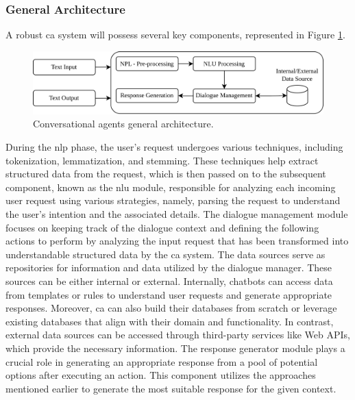 \documentclass[a4paper,fleqn]{cas-dc}
\begin{document}
\subsubsection{General Architecture}

A robust \gls{ca} system will possess several key components, represented in Figure \ref{fig:ConversationalAgentGeneralArchitecture}.

\begin{figure}[htbp]
	\centering
	\includegraphics[width=\linewidth]{figs/ConversationalAgentGeneralArchitecture.png}
	\caption{Conversational agents general architecture.}
	\label{fig:ConversationalAgentGeneralArchitecture}
\end{figure}

During the \gls{nlp} phase, the user's request undergoes various techniques, including tokenization, lemmatization, and stemming. These techniques help extract structured data from the request, which is then passed on to the subsequent component, known as the \gls{nlu} module, responsible for analyzing each incoming user request using various strategies, namely, parsing the request to understand the user's intention and the associated details. The dialogue management module focuses on keeping track of the dialogue context and defining the following actions to perform by analyzing the input request that has been transformed into understandable structured data by the \gls{ca} system. The data sources serve as repositories for information and data utilized by the dialogue manager. These sources can be either internal or external. Internally, chatbots can access data from templates or rules to understand user requests and generate appropriate responses. Moreover, \gls{ca} can also build their databases from scratch or leverage existing databases that align with their domain and functionality. In contrast, external data sources can be accessed through third-party services like Web APIs, which provide the necessary information. The response generator module plays a crucial role in generating an appropriate response from a pool of potential options after executing an action. This component utilizes the approaches mentioned earlier to generate the most suitable response for the given context. \cite{rizou_multilingual_2022, mohamad_suhaili_service_2021}
\end{document}
